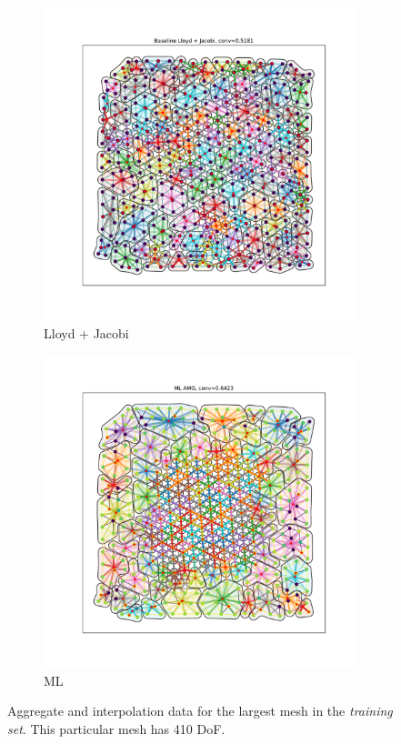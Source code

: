 \documentclass{article}
\begin{document}
\begin{figure}[h]
  \centering
  \begin{subfigure}[t]{0.49\textwidth}
    \centering
    \includegraphics[width=\textwidth]{grid_largest_lloyd.pdf}
    \caption{Lloyd + Jacobi}
  \end{subfigure}
  \begin{subfigure}[t]{0.49\textwidth}
    \centering
    \includegraphics[width=\textwidth]{grid_largest_ml.pdf}
    \caption{ML}
  \end{subfigure}
  \caption{Aggregate and interpolation data for the largest mesh in the \textit{training set}.  This particular mesh has 410 DoF.}
  \label{fig:grid800}
\end{figure}
\end{document}
